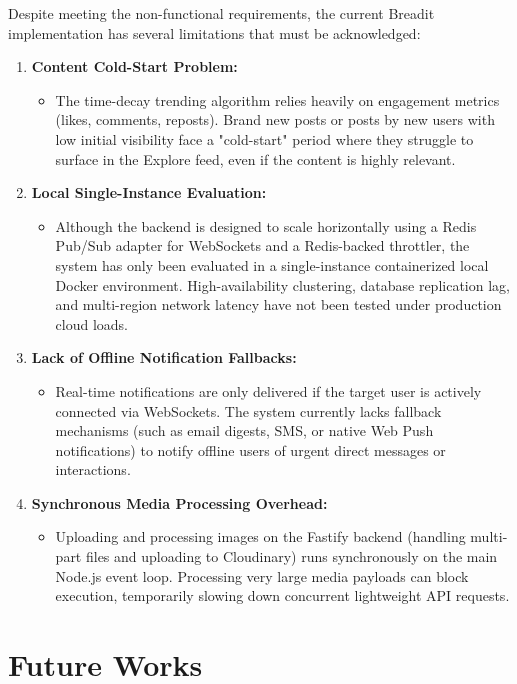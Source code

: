 Despite meeting the non-functional requirements, the current Breadit implementation has several limitations that must be acknowledged:
\begin{enumerate}
  \item \textbf{Content Cold-Start Problem:}
\begin{itemize}
  \item The time-decay trending algorithm relies heavily on engagement metrics (likes, comments, reposts). Brand new posts or posts by new users with low initial visibility face a "cold-start" period where they struggle to surface in the Explore feed, even if the content is highly relevant.
\end{itemize}
  \item \textbf{Local Single-Instance Evaluation:}
\begin{itemize}
  \item Although the backend is designed to scale horizontally using a Redis Pub/Sub adapter for WebSockets and a Redis-backed throttler, the system has only been evaluated in a single-instance containerized local Docker environment. High-availability clustering, database replication lag, and multi-region network latency have not been tested under production cloud loads.
\end{itemize}
  \item \textbf{Lack of Offline Notification Fallbacks:}
\begin{itemize}
  \item Real-time notifications are only delivered if the target user is actively connected via WebSockets. The system currently lacks fallback mechanisms (such as email digests, SMS, or native Web Push notifications) to notify offline users of urgent direct messages or interactions.
\end{itemize}
  \item \textbf{Synchronous Media Processing Overhead:}
\begin{itemize}
  \item Uploading and processing images on the Fastify backend (handling multi-part files and uploading to Cloudinary) runs synchronously on the main Node.js event loop. Processing very large media payloads can block execution, temporarily slowing down concurrent lightweight API requests.
\end{itemize}
\end{enumerate}

\section{Future Works}


